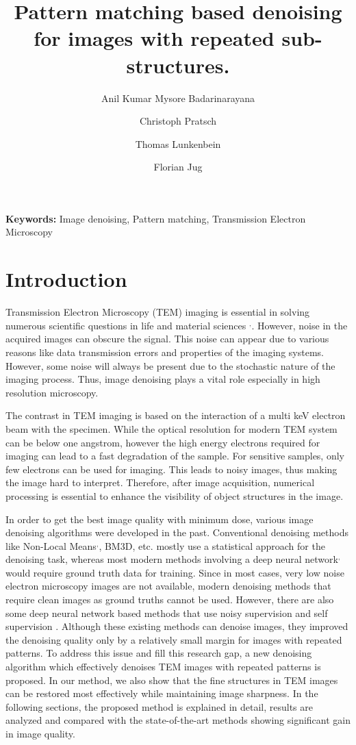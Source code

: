 \documentclass[fleqn,10pt]{wlscirep}
\title{Pattern matching based denoising for images with repeated sub-structures.}
\author[1,*]{Anil Kumar Mysore Badarinarayana}
\author[1]{Christoph Pratsch}
\author[2]{Thomas Lunkenbein}
\author[3]{Florian Jug}
\affil[1]{Hemholtz-Zentrum Berlin, X-ray microscopy, Berlin, 12489, Germany}
\affil[2]{Fritz Haber Institute, Department of Inorganic Chemistry, Berlin, 14195, Germany}
\affil[3]{Fondazione Human Technopole, Computational Biology, Milan, 20157, Italy}
\affil[*]{anil.mysore\_badarinarayana@helmholtz-berlin.de}
\begin{document}
	
	\maketitle
	
	\noindent
	\textbf{Keywords:} Image denoising, Pattern matching, Transmission Electron Microscopy
	
	\section*{Introduction}
	
	Transmission Electron Microscopy (TEM) imaging is essential in solving numerous scientific questions in life and material sciences \cite{CURRY200691}$^{,}$\cite{WANG2008395}. However, noise in the acquired images can obscure the signal. This noise can appear due to various reasons like data transmission errors and properties of the imaging systems. However, some noise will always be present due to the stochastic nature of the imaging process. Thus, image denoising plays a vital role especially in high resolution microscopy.
	
	The contrast in TEM imaging is based on the interaction of a multi keV electron beam with the specimen. While the optical resolution for modern TEM system can be below one angstrom, however the high energy electrons required for imaging can lead to a fast degradation of the sample. For sensitive samples, only few electrons can be used for imaging. This leads to noisy images, thus making the image hard to interpret. Therefore, after image acquisition, numerical processing is essential to enhance the visibility of object structures in the image.
	
	In order to get the best image quality with minimum dose, various image denoising algorithms were developed in the past. Conventional denoising methods like Non-Local Means\cite{bcm_nlm}$^{,}$, BM3D\cite{DBLP:journals/tip/BM3D}, etc. mostly use a statistical approach for the denoising task, whereas most modern methods involving a deep neural network\cite{zhang2018ffdnet}$^{,}$ \cite{zhang2017beyond} would require ground truth data for training. Since in most cases, very low noise electron microscopy images are not available, modern denoising methods that require clean images as ground truths cannot be used. However, there are also some deep neural network based methods that use noisy supervision\cite{DBLP:journals/corr/abs-1803-04189} and self supervision\cite{krull2019noise2void} . Although these existing methods can denoise images, they improved the denoising quality only by a relatively small margin for images with repeated patterns. To address this issue and fill this research gap, a new denoising algorithm which effectively denoises TEM images with repeated patterns is proposed. In  our method, we also show that the fine structures in TEM images can be restored most effectively while maintaining image sharpness. In the following sections, the proposed method is explained in detail, results are analyzed and compared with the state-of-the-art methods showing significant gain in image quality. 
	
\end{document}
